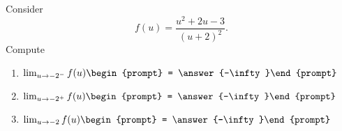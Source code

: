 \documentclass{ximera}
\author{Bart Snapp}
\begin{document}
\begin{exercise}
Consider 
\[
f(u) = \frac{u^2+2 u-3}{(u+2)^2}.
\]
Compute
\begin{enumerate}
\item $\lim_{u\to -2^- } f(u) \begin{prompt} = \answer{-\infty}\end{prompt}$
\item $\lim_{u\to -2^+ } f(u) \begin{prompt} = \answer{-\infty}\end{prompt}$
\item $\lim_{u\to -2 } f(u) \begin{prompt} = \answer{-\infty}\end{prompt}$
\end{enumerate}
\end{exercise}
\end{document}
